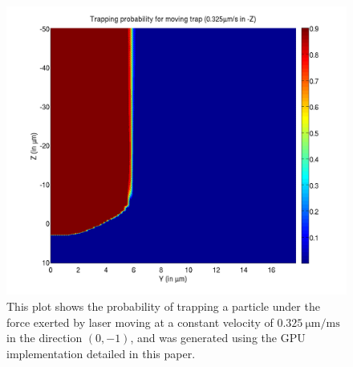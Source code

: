 \begin{figure}[htb!]
  \includegraphics[width=\columnwidth]{figures/gpu_moving_0_325_z}
\caption{
  This plot shows the probability of trapping a particle under
  the force exerted by laser moving at a constant velocity of
  $\SI{0.325}{\micro\meter\per\milli\second}$ in the direction
  $(0,-1)$, and was generated using the GPU implementation detailed in 
  this paper.
}
\label{fig:trapping-prob-zvel-gpu}
\end{figure}





